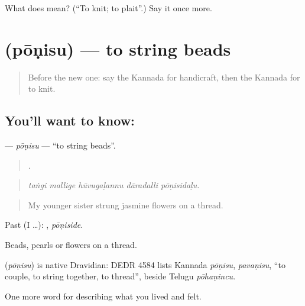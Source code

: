 \begin{tcolorbox}[breakable,colback=teal!4,colframe=teal!35!black,title={Before you move on}]
What does  mean? (\textquotedblleft{}To knit; to plait\textquotedblright{}.) Say it once more.
\end{tcolorbox}
\section[\texorpdfstring{\kn{ಪೋಣಿಸು} (pōṇisu)}{ಪೋಣಿಸು (pōṇisu)}]{ (pōṇisu) — to string beads}

\label{lesson:KA-C533-ponisu}



\begin{quote}
Before the new one: say the Kannada for handicraft, then the Kannada for to knit.
\end{quote}

\subsection*{You'll want to know: }
\textbf{} — \emph{pōṇisu} — \textquotedblleft{}to string beads\textquotedblright{}.

\begin{quote}
    .
\end{quote}

\begin{quote}
\emph{taṅgi mallige hūvugaḷannu dāradalli pōṇisidaḷu.}
\end{quote}

\begin{quote}
My younger sister strung jasmine flowers on a thread.
\end{quote}

Past (I …): , \emph{pōṇiside}.

Beads, pearls or flowers on a thread.

\begin{cousinweb}
\textbf{} (\emph{pōṇisu}) is native Dravidian: DEDR 4584 lists Kannada \emph{pōṇisu}, \emph{pavaṇisu}, \textquotedblleft{}to couple, to string together, to thread\textquotedblright{}, beside Telugu \emph{pōhaṇincu}.
\end{cousinweb}

\begin{grammarlens}[title={What you've built}]
One more word for describing what you lived and felt.
\end{grammarlens}

